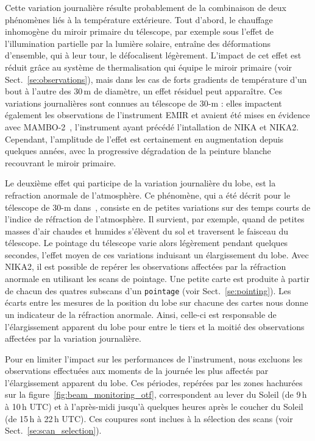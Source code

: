 Cette variation journalière résulte probablement de la combinaison de
deux phénomènes liés à la température extérieure. Tout d'abord, le
chauffage inhomogène du miroir primaire du télescope, par exemple sous
l'effet de l'illumination partielle par la lumière solaire, entraîne
des déformations d'ensemble, qui à leur tour, le défocalisent
légèrement. L'impact de cet effet est réduit grâce au système de
thermalisation qui équipe le miroir primaire (voir
Sect.~\ref{se:observations}), mais dans les cas de forts gradients de
température d'un bout à l'autre des 30\,m de diamètre, un effet
résiduel peut apparaître. Ces variations journalières sont connues au
télescope de 30-m : elles impactent également les observations de
l'instrument EMIR et avaient été mises en évidence avec
MAMBO-2~\citep{Kreysa1999}, l'instrument ayant précédé l'intallation
de NIKA et NIKA2. Cependant, l'amplitude de l'effet est certainement
en augmentation depuis quelques années, avec la progressive
dégradation de la peinture blanche recouvrant le miroir primaire.

Le deuxième effet qui participe de la variation journalière du lobe,
est la refraction anormale de l'atmosphère. Ce phénomène, qui a été
décrit pour le télescope de 30-m dans~\citet{Altenhoff1987}, consiste
en de petites variations sur des temps courts de l'indice de
réfraction de l'atmosphère. Il survient, par exemple, quand de petites
masses d'air chaudes et humides s'élèvent du sol et traversent le
faisceau du télescope. Le pointage du télescope varie alors légèrement
pendant quelques secondes, l'effet moyen de ces variations induisant
un élargissement du lobe. Avec NIKA2, il est possible de repérer les
observations affectées par la réfraction anormale en utilisant les
scans de pointage. Une petite carte est produite à partir de chacun
des quatres subscans d'un {\tt pointage} (voir
Sect.~\ref{se:pointing}). Les écarts entre les mesures de la
position du lobe sur chacune des cartes nous donne un indicateur de
la réfraction anormale. Ainsi, celle-ci est responsable de
l'élargissement apparent du lobe pour entre le tiers et la moitié des
observations affectées par la variation journalière.  


Pour en limiter l'impact sur les performances de l'instrument, nous
excluons les observations effectuées aux moments de la journée les
plus affectés par l'élargissement apparent du lobe. Ces périodes,
repérées par les zones hachurées sur la
figure~\ref{fig:beam_monitoring_otf}, correspondent au lever du Soleil
(de 9\,h à 10\,h UTC) et à l'après-midi jusqu'à quelques heures après
le coucher du Soleil (de 15\,h à 22\,h UTC). Ces coupures sont inclues
à la sélection des scans (voir Sect.~\ref{se:scan_selection}).





